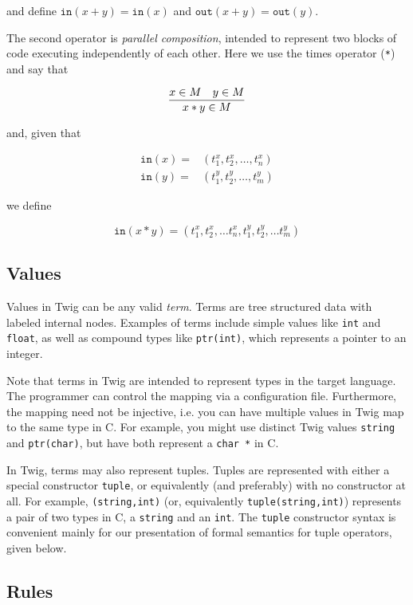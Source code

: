 and define $\mathtt{in}(x+y) = \mathtt{in}(x)$ and $\mathtt{out}(x+y) =
\mathtt{out}(y)$.

The second operator is \emph{parallel composition}, intended to represent two
blocks of code executing independently of each other. Here we use the times
operator (\texttt{*}) and say that

\[
\infer
{x*y \in M}
{x \in M \quad y \in M}
\]

and, given that 

\begin{eqnarray*}
\mathtt{in}(x) =& (t^x_1,t^x_2,\hdots,t^x_n)\\
\mathtt{in}(y) =& (t^y_1,t^y_2,\hdots,t^y_m)
\end{eqnarray*}

we define 

\[
\mathtt{in}(x*y) = (t^x_1,t^x_2, \hdots t^x_n,t^y_1,t^y_2, \hdots t^y_m)
\]






\subsection{Values}

Values in Twig can be any valid \emph{term}. Terms are tree structured data
with labeled internal nodes. Examples of terms include simple values like
\texttt{int} and \texttt{float}, as well as compound types like
\texttt{ptr(int)}, which represents a pointer to an integer.

Note that terms in Twig are intended to represent types in the target
language. The programmer can control the mapping via a configuration file.
Furthermore, the mapping need not be injective, i.e. you can have multiple
values in Twig map to the same type in C. For example, you might use distinct
Twig values \texttt{string} and \texttt{ptr(char)}, but have both represent a
\texttt{char *} in C.

In Twig, terms may also represent tuples. Tuples are represented with either a
special constructor \texttt{tuple}, or equivalently (and preferably) with no
constructor at all. For example, \texttt{(string,int)} (or, equivalently
\texttt{tuple(string,int)}) represents a pair of two types in C, a
\texttt{string} and an \texttt{int}. The \texttt{tuple} constructor syntax is
convenient mainly for our presentation of formal semantics for tuple
operators, given below.

\subsection{Rules}

